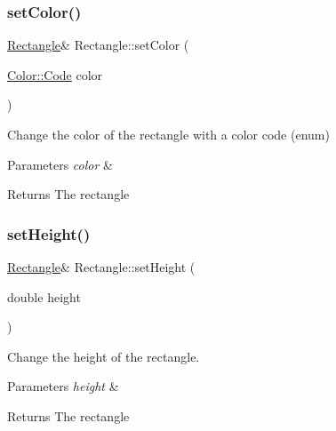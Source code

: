 \subsubsection{\texorpdfstring{set\+Color()}{setColor()}\hspace{0.1cm}{\footnotesize\ttfamily [2/2]}}
{\footnotesize\ttfamily \hyperlink{classRectangle}{Rectangle}\& Rectangle\+::set\+Color (\begin{DoxyParamCaption}\item[{\hyperlink{classColor_a20a7b04657c1d83fae5d54514d3f1622}{Color\+::\+Code}}]{color }\end{DoxyParamCaption})}



Change the color of the rectangle with a color code (enum) 


\begin{DoxyParams}{Parameters}
{\em color} & \\
\hline
\end{DoxyParams}
\begin{DoxyReturn}{Returns}
The rectangle 
\end{DoxyReturn}
\mbox{\label{classRectangle_ac4d4ed333eff18fe9bc790a9d9fe5af5}} 
\subsubsection{\texorpdfstring{set\+Height()}{setHeight()}}
{\footnotesize\ttfamily \hyperlink{classRectangle}{Rectangle}\& Rectangle\+::set\+Height (\begin{DoxyParamCaption}\item[{double}]{height }\end{DoxyParamCaption})}



Change the height of the rectangle. 


\begin{DoxyParams}{Parameters}
{\em height} & \\
\hline
\end{DoxyParams}
\begin{DoxyReturn}{Returns}
The rectangle 
\end{DoxyReturn}
\mbox{\label{classRectangle_a52dd37288586383161274d0b6ec5b7f7}} 

